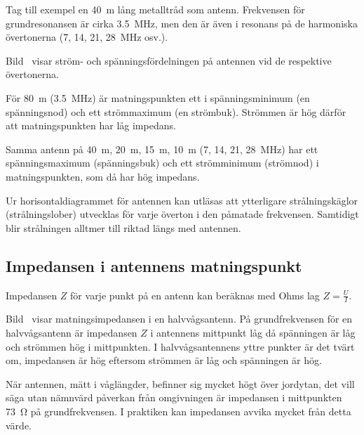 Tag till exempel en \qty{40}{\metre} lång metalltråd som antenn.
Frekvensen för grundresonansen är cirka \qty{3,5}{\mega\hertz}, men den är även
i resonans på de harmoniska övertonerna (7, 14, 21, \qty{28}{\mega\hertz} osv.).

Bild~ visar ström- och spänningsfördelningen på antennen
vid de respektive övertonerna.

För \qty{80}{\metre} (\qty{3,5}{\mega\hertz}) är matningspunkten ett i
spänningsminimum (en spänningsnod) och ett strömmaximum (en strömbuk).
Strömmen är hög därför att matningspunkten har låg impedans.

Samma antenn på \qty{40}{\metre}, \qty{20}{\metre}, \qty{15}{\metre},
\qty{10}{\metre} (7, 14, 21, \qty{28}{\mega\hertz}) har ett spänningsmaximum
(spänningsbuk) och ett strömminimum (strömnod) i matningspunkten, som då har hög
impedans.

Ur horisontaldiagrammet för antennen kan utläsas att ytterligare
strålningskäglor (strålningslober) utvecklas för varje överton i den
påmatade frekvensen.
Samtidigt blir strålningen alltmer till riktad längs med antennen.

\subsection{Impedansen i antennens matningspunkt}
\label{antenner_impedans}



Impedansen \(Z\) för varje punkt på en antenn kan beräknas med Ohms lag
\(Z = \frac{U}{I}\).

Bild~ visar matningsimpedansen i en halvvågsantenn.
På grundfrekvensen för en halvvågsantenn är impedansen \(Z\) i antennens
mittpunkt låg då spänningen är låg och strömmen hög i mittpunkten.
I halvvågsantennens yttre punkter är det tvärt om, impedansen är hög eftersom
strömmen är låg och spänningen är hög.

När antennen, mätt i våglängder, befinner sig mycket högt över jordytan, det
vill säga utan nämnvärd påverkan från omgivningen är impedansen i mittpunkten
\qty{73}{\ohm} på grundfrekvensen.
I praktiken kan impedansen avvika mycket från detta värde.

